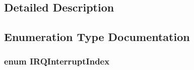 \subsection{Detailed Description}


\subsection{Enumeration Type Documentation}
\hypertarget{group___interrupt__vector__numbers_ga5f3656e2a154b64aa378a2f3856c3a8d}{}
\subsubsection[{I\+R\+Q\+Interrupt\+Index}]{\setlength{\rightskip}{0pt plus 5cm}enum {\bf I\+R\+Q\+Interrupt\+Index}}\label{group___interrupt__vector__numbers_ga5f3656e2a154b64aa378a2f3856c3a8d}
